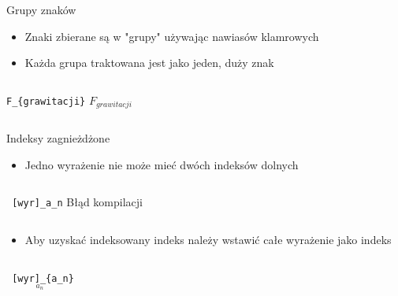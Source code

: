 \documentclass{beamer}
\theoremstyle{newblock}
\begin{document}
\begin{frame}[fragile]{Grupy znaków}
    \begin{itemize}
        \item Znaki zbierane są w "grupy" używając nawiasów klamrowych
        \item Każda grupa traktowana jest jako jeden, duży znak
    \end{itemize}
    \pause
    \begin{columns}
            \centering
                \centering
                \verb|F_|\verb|{grawitacji}|
                \pause
                \centering
                $F_{grawitacji}$
        \end{columns}
\end{frame}
\begin{frame}[fragile]{Indeksy zagnieżdżone}
        \begin{itemize}
            \item Jedno wyrażenie nie może mieć dwóch indeksów dolnych 
        \end{itemize}

        \begin{columns}[onlytextwidth, c]
                \centering
                    \verb| [wyr]_a_n|
                \centering
                \alert{Błąd kompilacji}
        \end{columns}

        \begin{itemize}
            \item Aby uzyskać indeksowany indeks należy wstawić całe wyrażenie jako indeks
        \end{itemize}
        \begin{columns}[onlytextwidth, c]
                \centering
                    \verb| [wyr]_{a_n}|
                \begin{equation*}
                    [wyr]_{a_n}
                \end{equation*}
        \end{columns}
        
\end{frame}
\end{document}
